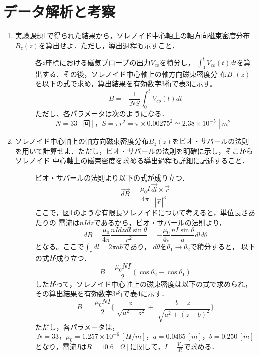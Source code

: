
\section{データ解析と考察}
\begin{enumerate}
    \item 実験課題1で得られた結果から，ソレノイド中心軸上の軸方向磁束密度分布
    $B_z(z)$を算出せよ．ただし，導出過程も示すこと．
    \begin{description}
        \item[] 各$z$座標における磁気プローブの出力$V_{co}$を積分し，
        $\int_{0}^{t} V_{co}(t)dt$を算出する．その後，ソレノイド中心軸上の軸方向磁束密度分
        布$B_z(z)$を以下の式で求め，算出結果を有効数字3桁で表3に示す。
        $$
        B=-\frac{1}{NS}\int_{0}^{t} V_{co}(t)dt
        $$
        ただし、各パラメータは次のようになる．
        $$
        N=33\,[回]，S=\pi r^2=\pi \times 0.00275^2 \simeq 2.38\times 10^{-5}\,[\si{m^2}]
        $$

    \end{description}

    \item ソレノイド中心軸上の軸方向磁束密度分布$B_z(z)$をビオ・サバールの法則
    を用いて計算せよ．ただし，ビオ・サバールの法則を明確に示し，そこからソレノイド
    中心軸上の磁束密度を求める導出過程も詳細に記述すること．
    \begin{description}
        \item[] ビオ・サバールの法則より以下の式が成り立つ．
        $$
        \vec{dB}=\frac{\mu_0 I}{4\pi}\frac{\vec{dl}\times\vec{r}}{|\vec{r}|^3}
        $$
        ここで，図1のような有限長ソレノイドについて考えると，単位長さあたりの
        電流は$nIdz$であるから，ビオ・サバールの法則より，
        $$
        dB=\frac{\mu_0}{4\pi}\frac{nIdzdl\sin\theta}{r^2}=-\frac{\mu_0}{4\pi}\frac{nI\sin\theta}{a}dld\theta
        $$
        となる。ここで$\int_{c}dl=2\pi ab$であり，
        $d\theta$を$\theta_1 \rightarrow \theta_2$で積分すると，
        以下の式が成り立つ．
        $$
        B=\frac{\mu_0 NI}{2}(\cos\theta_2 - \cos\theta_1)
        $$
        したがって，ソレノイド中心軸上の磁束密度は以下の式で求められ，
        その算出結果を有効数字3桁で表4に示す．
        $$
        B_z=\frac{\mu_0 NI}{2}\{\frac{z}{\sqrt[]{a^2+z^2}}+\frac{b-z}{\sqrt[]{a^2+(z-b)^2}}\}
        $$
        ただし，各パラメータは，
        $$
        N=33，\mu_0=1.257\times 10^{-6}\,[\si{H/m}]，a=0.0465\,[\si{m}]，b=0.250\,[\si{m}]
        $$
        となり，電流$I$は$R=10.6\,[\si{\Omega}]$に関して，$I=\frac{V_R}{R}$で求める．
    \end{description}
    

\end{enumerate}
